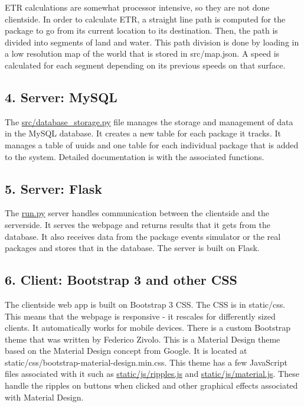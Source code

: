 E\+TR calculations are somewhat processor intensive, so they are not done clientside. In order to calculate E\+TR, a straight line path is computed for the package to go from its current location to its destination. Then, the path is divided into segments of land and water. This path division is done by loading in a low resolution map of the world that is stored in {\ttfamily src/map.\+json}. A speed is calculated for each segment depending on its previous speeds on that surface.

\subsection*{4. Server\+: My\+S\+QL}

The {\ttfamily \hyperlink{database__storage_8py}{src/database\+\_\+storage.\+py}} file manages the storage and management of data in the My\+S\+QL database. It creates a new table for each package it tracks. It manages a table of {\ttfamily uuids} and one table for each individual package that is added to the system. Detailed documentation is with the associated functions.

\subsection*{5. Server\+: Flask}

The {\ttfamily \hyperlink{run_8py}{run.\+py}} server handles communication between the clientside and the serverside. It serves the webpage and returns results that it gets from the database. It also receives data from the package events simulator or the real packages and stores that in the database. The server is built on Flask.

\subsection*{6. Client\+: Bootstrap 3 and other C\+SS}

The clientside web app is built on Bootstrap 3 C\+SS. The C\+SS is in {\ttfamily static/css}. This means that the webpage is responsive -\/ it rescales for differently sized clients. It automatically works for mobile devices. There is a custom Bootstrap theme that was written by Federico Zivolo. This is a Material Design theme based on the Material Design concept from Google. It is located at {\ttfamily static/css/bootstrap-\/material-\/design.\+min.\+css}. This theme has a few Java\+Script files associated with it such as {\ttfamily \hyperlink{ripples_8js}{static/js/ripples.\+js}} and {\ttfamily \hyperlink{material_8js}{static/js/material.\+js}}. These handle the ripples on buttons when clicked and other graphical effects associated with Material Design.

